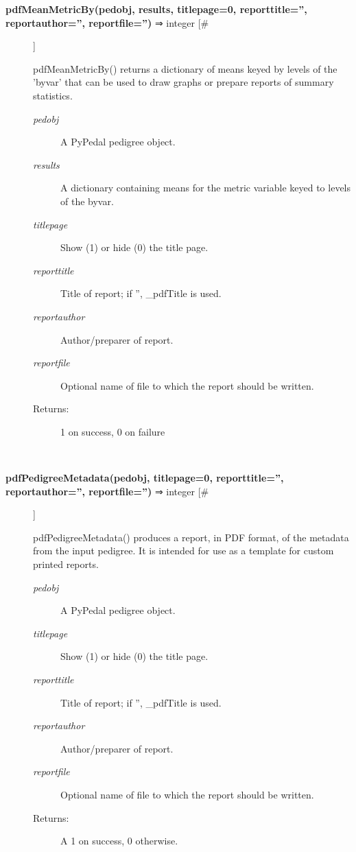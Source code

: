 \begin{description}
\item[\textbf{pdfMeanMetricBy(pedobj, results, titlepage=0, reporttitle='', reportauthor='', reportfile='')} ⇒ integer [\#]
]
\par pdfMeanMetricBy() returns a dictionary of means keyed by levels of the 'byvar' that
can be used to draw graphs or prepare reports of summary statistics.
\begin{description}
\item[\textit{pedobj}
]
A PyPedal pedigree object.
\item[\textit{results}
]
A dictionary containing means for the metric variable keyed to levels of the byvar.
\item[\textit{titlepage}
]
Show (1) or hide (0) the title page.
\item[\textit{reporttitle}
]
Title of report; if '', \_pdfTitle is used.
\item[\textit{reportauthor}
]
Author/preparer of report.
\item[\textit{reportfile}
]
Optional name of file to which the report should be written.
\item[Returns:
]
1 on success, 0 on failure
\end{description}\\

\item[\textbf{pdfPedigreeMetadata(pedobj, titlepage=0, reporttitle='', reportauthor='', reportfile='')} ⇒ integer [\#]
]
\par pdfPedigreeMetadata() produces a report, in PDF format, of the metadata from
the input pedigree.  It is intended for use as a template for custom printed
reports.
\begin{description}
\item[\textit{pedobj}
]
A PyPedal pedigree object.
\item[\textit{titlepage}
]
Show (1) or hide (0) the title page.
\item[\textit{reporttitle}
]
Title of report; if '', \_pdfTitle is used.
\item[\textit{reportauthor}
]
Author/preparer of report.
\item[\textit{reportfile}
]
Optional name of file to which the report should be written.
\item[Returns:
]
A 1 on success, 0 otherwise.
\end{description}\\

\end{description}
